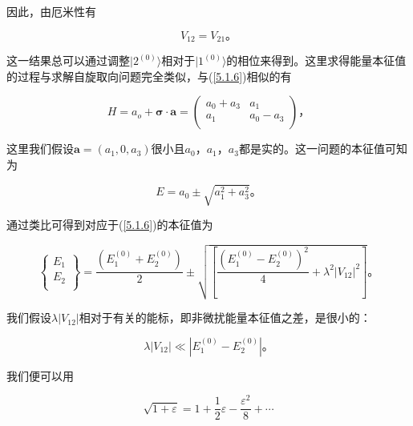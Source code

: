 ﻿\documentclass[UTF8,twoside]{ctexart}
\begin{document}
\noindent 因此，由厄米性有

\begin{equation} \label{5.1.8}
V_{12} = V_{21}\text{。}
\end{equation}

\noindent 这一结果总可以通过调整$|2^{(0)}\rangle$相对于$|1^{(0)}\rangle$的相位来得到。这里求得能量本征值的过程与求解自旋取向问题完全类似，与(\ref{5.1.6})相似的有

\begin{equation} \label{5.1.9}
H = a_o + \boldsymbol{\sigma \cdot a} = \left( \begin{array}{cc}
a_0 + a_3 & a_1 \\
a_1 & a_0 - a_3 \\
\end{array} \right)\text{，}
\end{equation}

\noindent 这里我们假设$\boldsymbol{a} = (a_1,0,a_3)$很小且$a_0$，$a_1$，$a_3$都是实的。这一问题的本征值可知为

\begin{equation} \label{5.1.10}
E = a_0 \pm \sqrt{a_1^{2}+a_3^{2}}\text{。}
\end{equation}

\noindent 通过类比可得到对应于(\ref{5.1.6})的本征值为

\begin{equation} \label{5.1.11}
\left\{ \begin{array}{c}
E_1 \\
E_2 \\
\end{array} \right\} = \dfrac{\left(E_1^{\left(0\right)}+E_2^{\left(0\right)}\right)}{2}\pm \sqrt{\left[\dfrac{\left(E_1^{\left(0\right)} - E_2^{\left(0\right)}\right)^2}{4} + \lambda ^{2}|V_{12}|^{2} \right]}\text{。}
\end{equation}

\noindent 我们假设$\lambda|V_{12}|$相对于有关的能标，即非微扰能量本征值之差，是很小的：

\begin{equation} \label{5.1.12}
\lambda|V_{12}|\ll|E_1^{\left(0\right)}-E_2^{\left(0\right)}|\text{。}
\end{equation}

\noindent 我们便可以用

\begin{equation} \label{5.1.13}
\sqrt{1+\varepsilon} = 1 + \dfrac{1}{2}\varepsilon - \dfrac{\varepsilon ^2}{8} + \cdots
\end{equation}
\end{document}
